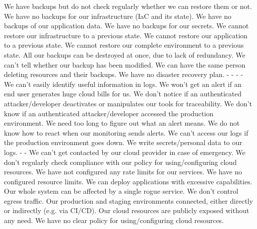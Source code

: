  {We have backups but do not check regularly whether we can restore them or not.}
 {We have no backups for our infrastructure (IaC and its state).}
 {We have no backups of our application data.}
 {We have no backups for our secrets.}
 {We cannot restore our infrastructure to a previous state.}
 {We cannot restore our application to a previous state.}
 {We cannot restore our complete environment to a previous state.}
 {All our backups can be destroyed at once, due to lack of redundancy.}
 {We can't tell whether our backup has been modified.}
 {We can have the same person deleting resources and their backups.}
 {We have no disaster recovery plan.}
%
 {-}
 {-}
 {-}
 {-}
 {We can't easily identify useful information in logs.}
 {We won't get an alert if an end user generates huge cloud bills for us.}
 {We don't notice if an authenticated attacker/developer deactivates or manipulates our tools for traceability.}
 {We don't know if an authenticated attacker/developer accessed the production environment.}
 {We need too long to figure out what an alert means.}
 {We do not know how to react when our monitoring sends alerts.}
 {We can't access our logs if the production environment goes down.}
 {We write secrets/personal data to our logs.}
%
 {-}
 {-}
 {We can't get contacted by our cloud provider in case of emergency.}
 {We don't regularly check compliance with our policy for using/configuring cloud resources.}
 {We have not configured any rate limits for our services.}
 {We have no configured resource limits.}
 {We can deploy applications with excessive capabilities.}
 {Our whole system can be affected by a single rogue service.}
 {We don't control egress traffic.}
 {Our production and staging environments connected, either directly or indirectly (e.g. via CI/CD).}
 {Our cloud resources are publicly exposed without any need.}
 {We have no clear policy for using/configuring cloud resources.}
